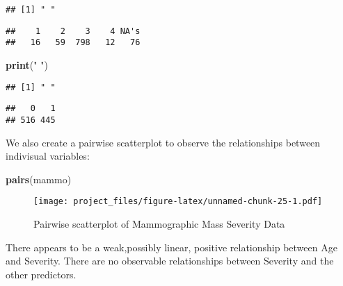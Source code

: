 \documentclass[]{article}
\newenvironment{Shaded}{\begin{snugshade}}{\end{snugshade}}
\newcommand{\KeywordTok}[1]{\textcolor[rgb]{0.13,0.29,0.53}{\textbf{#1}}}
\newcommand{\StringTok}[1]{\textcolor[rgb]{0.31,0.60,0.02}{#1}}
\newcommand{\OperatorTok}[1]{\textcolor[rgb]{0.81,0.36,0.00}{\textbf{#1}}}
\newcommand{\NormalTok}[1]{#1}
\begin{document}
\begin{verbatim}
## [1] " "
\end{verbatim}

\begin{Shaded}
\end{Shaded}

\begin{verbatim}
##    1    2    3    4 NA's 
##   16   59  798   12   76
\end{verbatim}

\begin{Shaded}
\begin{Highlighting}[]
\KeywordTok{print}\NormalTok{(}\StringTok{" "}\NormalTok{)}
\end{Highlighting}
\end{Shaded}

\begin{verbatim}
## [1] " "
\end{verbatim}

\begin{Shaded}
\end{Shaded}

\begin{verbatim}
##   0   1 
## 516 445
\end{verbatim}

We also create a pairwise scatterplot to observe the relationships
between indivisual variables:

\begin{Shaded}
\begin{Highlighting}[]
\KeywordTok{pairs}\NormalTok{(mammo)}
\end{Highlighting}
\end{Shaded}

\begin{figure}
\centering
\texttt{[image: project\_files/figure-latex/unnamed-chunk-25-1.pdf]}
\caption{Pairwise scatterplot of Mammographic Mass Severity Data}
\end{figure}

There appears to be a weak,possibly linear, positive relationship
between Age and Severity. There are no observable relationships between
Severity and the other predictors.
\end{document}
